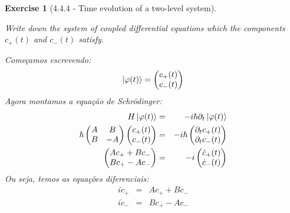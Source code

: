 \documentclass[12pt]{article}
\def\be{\begin{equation}}
\def\ee{\end{equation}}
\def\bea{\begin{eqnarray*}}
\def\eea{\end{eqnarray*}}
\def\beaa{\begin{eqnarray}}
\def\eeaa{\end{eqnarray}}
\newtheorem{exercise}{Exercise}
\begin{document}
\begin{exercise}[4.4.4 - Time evolution of a two-level system]
\begin{exercises}
		Write down the system of coupled differential equations which the components $c_{+}(t)$ and $c_{-}(t)$ satisfy.
		\begin{multianswer}
				Começamos escrevendo:
				\be
					\ket{\varphi(t)} = \begin{pmatrix}
						c_+(t) \\ c_-(t)
						\end{pmatrix}
				\ee
				Agora montamos a equação de Schrödinger:
				\bea
					H\ket{\varphi(t)} &=& -i\hbar \partial_t\ket{\varphi(t)} \\
					\hbar\begin{pmatrix}
						A & B \\
						B & -A
					\end{pmatrix} 
					\begin{pmatrix}
						c_+(t) \\ c_-(t)
					\end{pmatrix} 
					&=& 
					-i\hbar 
					\begin{pmatrix}
						\partial_t c_+(t) \\ \partial_t c_-(t)
					\end{pmatrix} \\
					\begin{pmatrix}
						Ac_+ + Bc_- \\ Bc_+ - Ac_-
					\end{pmatrix}
					&=&
					-i \begin{pmatrix}
						\dot{c}_+(t) \\ \dot{c}_-(t)
					\end{pmatrix}
				\eea
			Ou seja, temos as equações diferenciais:
			\beaa
				i\dot{c}_+ &=& Ac_+ + Bc_- \\
				i\dot{c}_- &=& Bc_+ - Ac_-
			\eeaa				
		\end{multianswer}
		

\end{exercises}
\end{exercise}
\end{document}
